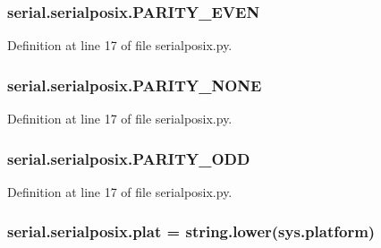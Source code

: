 \subsubsection[{\texorpdfstring{P\+A\+R\+I\+T\+Y\+\_\+\+E\+V\+EN}{PARITY_EVEN}}]{\setlength{\rightskip}{0pt plus 5cm}serial.\+serialposix.\+P\+A\+R\+I\+T\+Y\+\_\+\+E\+V\+EN}\hypertarget{namespaceserial_1_1serialposix_a592654b61618195fda85a78121744765}{}\label{namespaceserial_1_1serialposix_a592654b61618195fda85a78121744765}


Definition at line 17 of file serialposix.\+py.

\subsubsection[{\texorpdfstring{P\+A\+R\+I\+T\+Y\+\_\+\+N\+O\+NE}{PARITY_NONE}}]{\setlength{\rightskip}{0pt plus 5cm}serial.\+serialposix.\+P\+A\+R\+I\+T\+Y\+\_\+\+N\+O\+NE}\hypertarget{namespaceserial_1_1serialposix_aa5b7b60904211b474e9013237532ec87}{}\label{namespaceserial_1_1serialposix_aa5b7b60904211b474e9013237532ec87}


Definition at line 17 of file serialposix.\+py.

\subsubsection[{\texorpdfstring{P\+A\+R\+I\+T\+Y\+\_\+\+O\+DD}{PARITY_ODD}}]{\setlength{\rightskip}{0pt plus 5cm}serial.\+serialposix.\+P\+A\+R\+I\+T\+Y\+\_\+\+O\+DD}\hypertarget{namespaceserial_1_1serialposix_a67b92a3ff04918b300f44bcffa25a684}{}\label{namespaceserial_1_1serialposix_a67b92a3ff04918b300f44bcffa25a684}


Definition at line 17 of file serialposix.\+py.

\subsubsection[{\texorpdfstring{plat}{plat}}]{\setlength{\rightskip}{0pt plus 5cm}serial.\+serialposix.\+plat = string.\+lower(sys.\+platform)}\hypertarget{namespaceserial_1_1serialposix_aa4040a06e7e1b372ab5bcb9b9be9494b}{}\label{namespaceserial_1_1serialposix_aa4040a06e7e1b372ab5bcb9b9be9494b}



